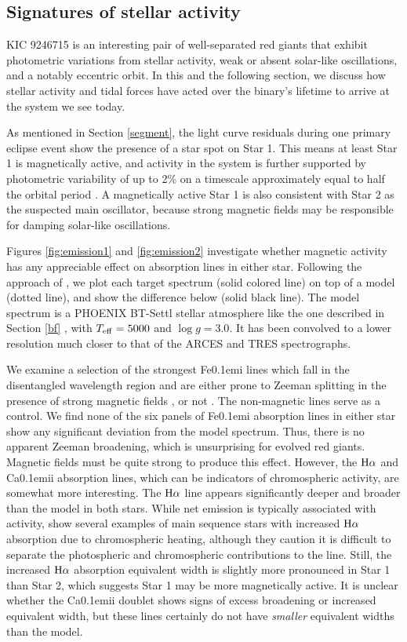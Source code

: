 \subsection{Signatures of stellar activity}\label{actrot}
KIC 9246715 is an interesting pair of well-separated red giants that exhibit photometric variations from stellar activity, weak or absent solar-like oscillations, and a notably eccentric orbit. In this and the following section, we discuss how stellar activity and tidal forces have acted over the binary's lifetime to arrive at the system we see today.

As mentioned in Section \ref{segment}, the light curve residuals during one primary eclipse event show the presence of a star spot on Star 1. This means at least Star 1 is magnetically active, and activity in the system is further supported by photometric variability of up to 2\% on a timescale approximately equal to half the orbital period \citep{gau14}. A magnetically active Star 1 is also consistent with Star 2 as the suspected main oscillator, because strong magnetic fields may be responsible for damping solar-like oscillations.

Figures \ref{fig:emission1} and \ref{fig:emission2} investigate whether magnetic activity has any appreciable effect on absorption lines in either star. Following the approach of \citet{fro12}, we plot each target spectrum (solid colored line) on top of a model (dotted line), and show the difference below (solid black line). The model spectrum is a PHOENIX BT-Settl stellar atmosphere like the one described in Section \ref{bf} \citep{all03,asp09}, with $T_{\rm{eff}} = 5000$ and $\log g = 3.0$. It has been convolved to a lower resolution much closer to that of the ARCES and TRES spectrographs.

We examine a selection of the strongest {\rm Fe}\kern 0.1em{\sc i} lines which fall in the disentangled wavelength region and are either prone to Zeeman splitting in the presence of strong magnetic fields \citep{har73}, or not \citep{sis70}. The non-magnetic lines serve as a control. We find none of the six panels of {\rm Fe}\kern 0.1em{\sc i} absorption lines in either star show any significant deviation from the model spectrum. Thus, there is no apparent Zeeman broadening, which is unsurprising for evolved red giants. Magnetic fields must be quite strong to produce this effect. However, the $\rm{H}\alpha$ and {\rm Ca}\kern 0.1em{\sc ii} absorption lines, which can be indicators of chromospheric activity, are somewhat more interesting. The $\rm{H}\alpha$ line appears significantly deeper and broader than the model in both stars. While net emission is typically associated with activity, \citet{rob90} show several examples of main sequence stars with increased $\rm{H}\alpha$ absorption due to chromospheric heating, although they caution it is difficult to separate the photospheric and chromospheric contributions to the line. Still, the increased $\rm{H}\alpha$ absorption equivalent width is slightly more pronounced in Star 1 than Star 2, which suggests Star 1 may be more magnetically active. It is unclear whether the {\rm Ca}\kern 0.1em{\sc ii} doublet shows signs of excess broadening or increased equivalent width, but these lines certainly do not have \emph{smaller} equivalent widths than the model.

